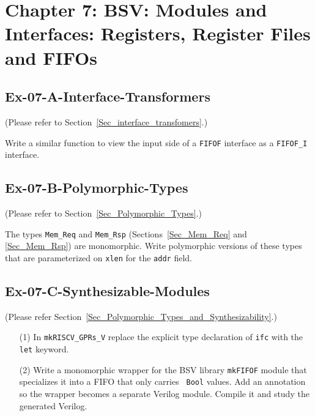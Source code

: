 
\hdivider

\section*{Chapter 7: BSV: Modules and Interfaces:
Registers, Register Files and FIFOs}


\subsection*{Ex-07-A-Interface-Transformers}

\label{Ex-07-A-Interface-Transformers}

(Please refer to Section~\ref{Sec_interface_transfomers}.)

Write a similar function to view the input side of a \verb|FIFOF|
interface as a {\tt FIFOF\_I} interface.


\subsection*{Ex-07-B-Polymorphic-Types}

\label{Ex-07-B-Polymorphic-Types}

(Please refer to Section~\ref{Sec_Polymorphic_Types}.)

The types {\tt Mem\_Req} and {\tt Mem\_Rsp}
(Sections~\ref{Sec_Mem_Req} and \ref{Sec_Mem_Rsp}) are monomorphic.
Write polymorphic versions of these types that are parameterized on
{\tt xlen} for the {\tt addr} field.


\subsection*{Ex-07-C-Synthesizable-Modules}

\label{Ex-07-C-Synthesizable-Modules}

(Please refer Section~\ref{Sec_Polymorphic_Types_and_Synthesizability}.)

\begin{itemize}

\item[(1)] In {\tt mkRISCV\_GPRs\_V} replace the explicit type declaration
      of {\tt ifc} with the {\tt let} keyword.

\item[(2)] Write a monomorphic wrapper for the BSV library {\tt mkFIFOF}
      module that specializes it into a FIFO that only carries {\tt
      Bool} values.  Add an annotation so the wrapper becomes a
      separate Verilog module.  Compile it and study the generated
      Verilog.

\end{itemize}

